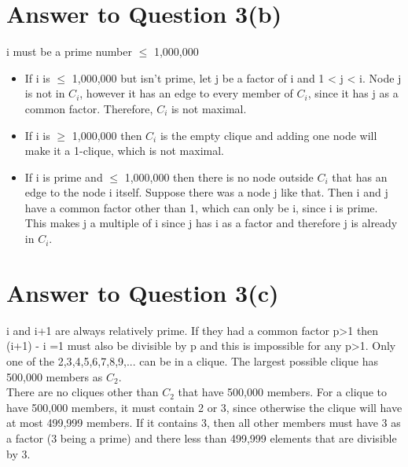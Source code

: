 \documentclass[11pt]{article}
\begin{document}
\section*{Answer to Question 3(b)}
i must be a prime number $\leq$ 1,000,000 
\begin{itemize}
\item If i is $\leq$ 1,000,000 but isn't prime, let j be a factor of i and 
1 < j < i. Node j is not in $C_i$, however it has an edge to every member of $C_i$, since it has j as a common factor. Therefore, $C_i$ is not maximal.
\item If i is $\geq$ 1,000,000  then $C_i$ is the empty clique and adding one node will make it a 1-clique, which is not maximal.
\item If i is prime and $\leq$ 1,000,000 then there is no node outside $C_i$ that has an edge to the node i itself. Suppose there was a node j like that. Then i and j have a common factor other than 1, which can only be i, since i is prime. This makes j a multiple of i since j has i as a factor and therefore j is already in $C_i$.
\end{itemize}
\section*{Answer to Question 3(c)}
i and i+1 are always relatively prime. If they had a common factor p>1 then (i+1) - i =1 must also be divisible by p and this is impossible for any p>1.
Only one of the {2,3},{4,5},{6,7},{8,9},... can be in a clique. The largest possible clique has 500,000 members as $C_2$.\\
There are no cliques other than $C_2$ that have 500,000 members. For a clique to have 500,000 members, it must contain 2 or 3, since otherwise the clique will have at most 499,999 members. If it contains 3, then all other members must have 3 as a factor (3 being a prime) and there less than 499,999 elements that are divisible by 3.
\end{document}
